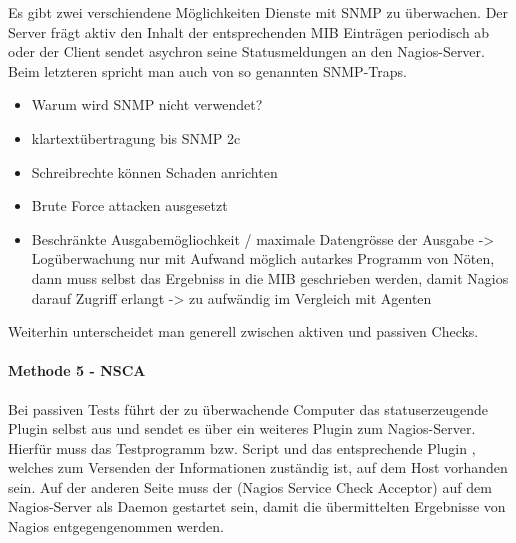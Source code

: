 Es gibt zwei verschiendene Möglichkeiten Dienste mit \gls{SNMP} zu überwachen.
Der Server frägt aktiv den Inhalt der entsprechenden MIB Einträgen periodisch ab oder der Client sendet asychron seine Statusmeldungen an den Nagios-Server.
Beim letzteren spricht man auch von so genannten \gls{SNMP}-Traps.


\begin{itemize}
\item Warum wird SNMP nicht verwendet?
\item klartextübertragung bis SNMP 2c
\item Schreibrechte können Schaden anrichten
\item Brute Force attacken ausgesetzt
\item Beschränkte Ausgabemögliochkeit / maximale Datengrösse der Ausgabe -> Logüberwachung nur mit Aufwand möglich autarkes Programm von Nöten, dann muss selbst das Ergebniss in die MIB geschrieben werden, damit Nagios darauf Zugriff erlangt -> zu aufwändig im Vergleich mit Agenten
\end{itemize}




Weiterhin unterscheidet man generell zwischen aktiven und passiven Checks.
\paragraph{Methode 5 - NSCA}
Bei passiven Tests führt der zu überwachende Computer das statuserzeugende Plugin selbst aus und sendet es über ein weiteres Plugin zum Nagios-Server.
Hierfür muss das Testprogramm bzw. Script und das entsprechende Plugin , welches zum Versenden der Informationen zuständig ist, auf dem Host vorhanden sein.
Auf der anderen Seite muss der  (Nagios Service Check Acceptor) auf dem Nagios-Server als Daemon gestartet sein, damit die übermittelten Ergebnisse von Nagios entgegengenommen werden.

